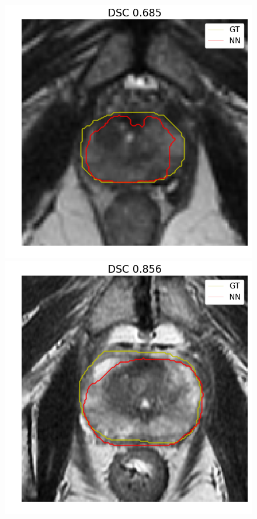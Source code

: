 \begin{figure}[h]
    \includegraphics[totalheight=.2\textheight]{figures/results/Prostate_GE__GE_yes_ROI_MIN_Case-0518.png}
    \includegraphics[totalheight=.2\textheight]{figures/results/Prostate_GE__GE_yes_ROI_MEAN_Case-0544.png}

\end{figure}
